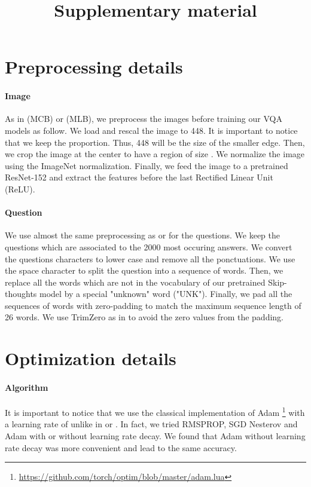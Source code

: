 \documentclass[10pt,twocolumn,letterpaper]{article}
\begin{document}
{\small


}

\title{Supplementary material}
\author{}

\maketitle

\section*{Preprocessing details}
\paragraph{Image}
As in \cite{fukui16mcb} (MCB) or \cite{Kim2017} (MLB), we preprocess the images before training our VQA models as follow. We load and rescal the image to 448. It is important to notice that we keep the proportion. Thus, 448 will be the size of the smaller edge. Then, we crop the image at the center to have a region of size . We normalize the image using the ImageNet normalization. Finally, we feed the image to a pretrained ResNet-152 and extract the features before the last Rectified Linear Unit (ReLU).

\paragraph{Question}

We use almost the same preprocessing as \cite{fukui16mcb} or \cite{Kim2017} for the questions.
We keep the questions which are associated to the 2000 most occuring answers.
We convert the questions characters to lower case and remove all the ponctuations. We use the space character to split the question into a sequence of words. Then, we replace all the words which are not in the vocabulary of our pretrained Skip-thoughts model by a special "unknown" word ("UNK").
Finally, we pad all the sequences of words with zero-padding to match the maximum sequence length of 26 words. We use TrimZero as in \cite{Kim2017} to avoid the zero values from the padding.


\section*{Optimization details}

\paragraph{Algorithm}
It is important to notice that we use the classical implementation of Adam \footnote{\url{https://github.com/torch/optim/blob/master/adam.lua}} with a learning rate of  unlike in \cite{fukui16mcb} or \cite{Kim2017}. In fact, we tried RMSPROP, SGD Nesterov and Adam with or without learning rate decay. We found that Adam without learning rate decay was more convenient and lead to the same accuracy.
\end{document}
